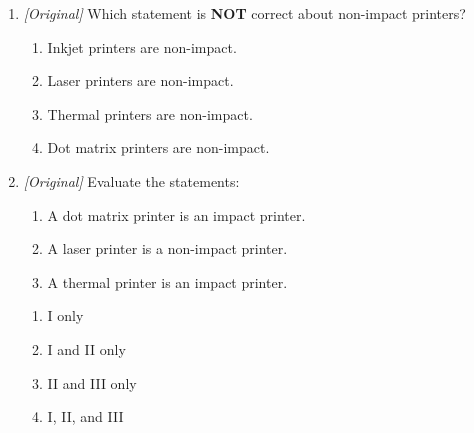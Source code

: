 \documentclass[11pt]{article}
\begin{document}
\begin{enumerate}[label=\textbf{Q\arabic*.}, leftmargin=*]
\item \textit{[Original]} Which statement is \textbf{NOT} correct about
  non-impact printers?
  \begin{enumerate}[label=\Alph*.]
    \item Inkjet printers are non-impact.
    \item Laser printers are non-impact.
    \item Thermal printers are non-impact.
    \item Dot matrix printers are non-impact.
  \end{enumerate}
\item \textit{[Original]} Evaluate the statements:
  \begin{enumerate}[label=\Roman*.]
    \item A dot matrix printer is an impact printer.
    \item A laser printer is a non-impact printer.
    \item A thermal printer is an impact printer.
  \end{enumerate}
  \begin{enumerate}[label=\Alph*.]
    \item I only
    \item I and II only
    \item II and III only
    \item I, II, and III
  \end{enumerate}


\end{enumerate}
\end{document}

